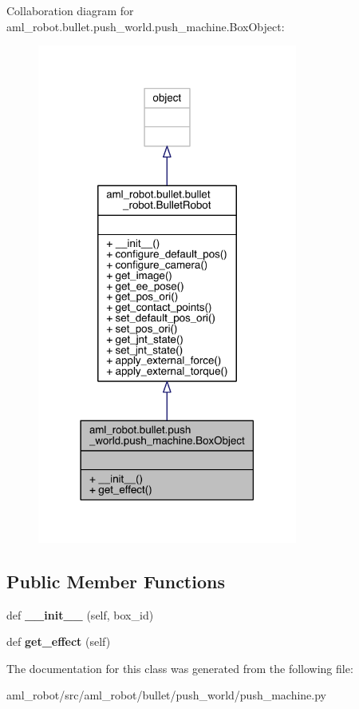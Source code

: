 Collaboration diagram for aml\+\_\+robot.\+bullet.\+push\+\_\+world.\+push\+\_\+machine.\+Box\+Object\+:\nopagebreak
\begin{figure}[H]
\begin{center}
\leavevmode
\includegraphics[width=242pt]{classaml__robot_1_1bullet_1_1push__world_1_1push__machine_1_1_box_object__coll__graph}
\end{center}
\end{figure}
\subsection*{Public Member Functions}
\begin{DoxyCompactItemize}
\item 
\hypertarget{classaml__robot_1_1bullet_1_1push__world_1_1push__machine_1_1_box_object_a6176168fbcfdc9c0c09808bf93e01e78}{}\label{classaml__robot_1_1bullet_1_1push__world_1_1push__machine_1_1_box_object_a6176168fbcfdc9c0c09808bf93e01e78} 
def {\bfseries \+\_\+\+\_\+init\+\_\+\+\_\+} (self, box\+\_\+id)
\item 
\hypertarget{classaml__robot_1_1bullet_1_1push__world_1_1push__machine_1_1_box_object_afaf0ea1787cdeda8b5266f9a1d37e723}{}\label{classaml__robot_1_1bullet_1_1push__world_1_1push__machine_1_1_box_object_afaf0ea1787cdeda8b5266f9a1d37e723} 
def {\bfseries get\+\_\+effect} (self)
\end{DoxyCompactItemize}


The documentation for this class was generated from the following file\+:\begin{DoxyCompactItemize}
\item 
aml\+\_\+robot/src/aml\+\_\+robot/bullet/push\+\_\+world/push\+\_\+machine.\+py\end{DoxyCompactItemize}
